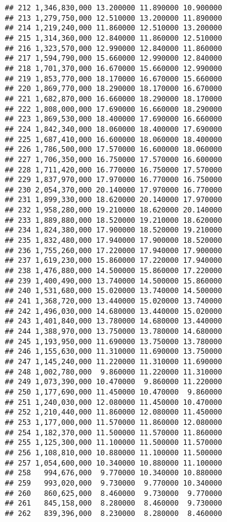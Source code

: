 \documentclass[]{article}
\begin{document}
\begin{verbatim}
## 212 1,346,830,000 13.200000 11.890000 10.900000
## 213 1,279,750,000 12.510000 13.200000 11.890000
## 214 1,219,240,000 11.860000 12.510000 13.200000
## 215 1,314,360,000 12.840000 11.860000 12.510000
## 216 1,323,570,000 12.990000 12.840000 11.860000
## 217 1,594,790,000 15.660000 12.990000 12.840000
## 218 1,701,370,000 16.670000 15.660000 12.990000
## 219 1,853,770,000 18.170000 16.670000 15.660000
## 220 1,869,770,000 18.290000 18.170000 16.670000
## 221 1,682,870,000 16.660000 18.290000 18.170000
## 222 1,808,000,000 17.690000 16.660000 18.290000
## 223 1,869,530,000 18.400000 17.690000 16.660000
## 224 1,842,340,000 18.060000 18.400000 17.690000
## 225 1,687,410,000 16.600000 18.060000 18.400000
## 226 1,786,500,000 17.570000 16.600000 18.060000
## 227 1,706,350,000 16.750000 17.570000 16.600000
## 228 1,711,420,000 16.770000 16.750000 17.570000
## 229 1,837,970,000 17.970000 16.770000 16.750000
## 230 2,054,370,000 20.140000 17.970000 16.770000
## 231 1,899,330,000 18.620000 20.140000 17.970000
## 232 1,958,280,000 19.210000 18.620000 20.140000
## 233 1,889,880,000 18.520000 19.210000 18.620000
## 234 1,824,380,000 17.900000 18.520000 19.210000
## 235 1,832,480,000 17.940000 17.900000 18.520000
## 236 1,755,260,000 17.220000 17.940000 17.900000
## 237 1,619,230,000 15.860000 17.220000 17.940000
## 238 1,476,880,000 14.500000 15.860000 17.220000
## 239 1,400,490,000 13.740000 14.500000 15.860000
## 240 1,531,680,000 15.020000 13.740000 14.500000
## 241 1,368,720,000 13.440000 15.020000 13.740000
## 242 1,496,030,000 14.680000 13.440000 15.020000
## 243 1,401,840,000 13.780000 14.680000 13.440000
## 244 1,388,970,000 13.750000 13.780000 14.680000
## 245 1,193,950,000 11.690000 13.750000 13.780000
## 246 1,155,630,000 11.310000 11.690000 13.750000
## 247 1,145,240,000 11.220000 11.310000 11.690000
## 248 1,002,780,000  9.860000 11.220000 11.310000
## 249 1,073,390,000 10.470000  9.860000 11.220000
## 250 1,177,690,000 11.450000 10.470000  9.860000
## 251 1,240,030,000 12.080000 11.450000 10.470000
## 252 1,210,440,000 11.860000 12.080000 11.450000
## 253 1,177,000,000 11.570000 11.860000 12.080000
## 254 1,182,370,000 11.500000 11.570000 11.860000
## 255 1,125,300,000 11.100000 11.500000 11.570000
## 256 1,108,810,000 10.880000 11.100000 11.500000
## 257 1,054,600,000 10.340000 10.880000 11.100000
## 258   994,676,000  9.770000 10.340000 10.880000
## 259   993,020,000  9.730000  9.770000 10.340000
## 260   860,625,000  8.460000  9.730000  9.770000
## 261   845,158,000  8.280000  8.460000  9.730000
## 262   839,396,000  8.230000  8.280000  8.460000

\end{verbatim}
\end{document}
